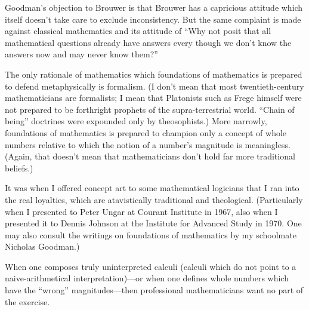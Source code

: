 Goodman's objection to Brouwer is that Brouwer has a capricious attitude which itself doesn't take care to exclude inconsistency. But the same complaint is made against classical mathematics and its attitude of \enquote{Why not posit that all mathematical questions already have answers every though we don't know the answers now and may never know them?}

\jarule

The only rationale of mathematics which foundations of mathematics is prepared to defend metaphysically is formalism. (I don't mean that most twentieth-century mathematicians are formalists; I mean that Platonists such as Frege himself were not prepared to be forthright prophets of the supra-terrestrial world. \enquote{Chain of being} doctrines were expounded only by theosophists.) More narrowly, foundations of mathematics is prepared to champion only a concept of whole numbers relative to which the notion of a number's magnitude is meaningless. (Again, that doesn't mean that mathematicians don't hold far more traditional beliefs.)

It was when I offered concept art to some mathematical logicians that I ran into the real loyalties, which are atavistically traditional and theological. (Particularly when I presented  to Peter Ungar at Courant Institute in 1967, also when I presented it to Dennis Johnson at the Institute for Advanced Study in 1970. One may also consult the writings on foundations of mathematics by my schoolmate Nicholas Goodman.)

When one composes truly uninterpreted calculi (calculi which do not point to a naive-arithmetical interpretation)---or when one defines whole numbers which have the \enquote{wrong} magnitudes---then professional mathematicians want no part of the exercise.

